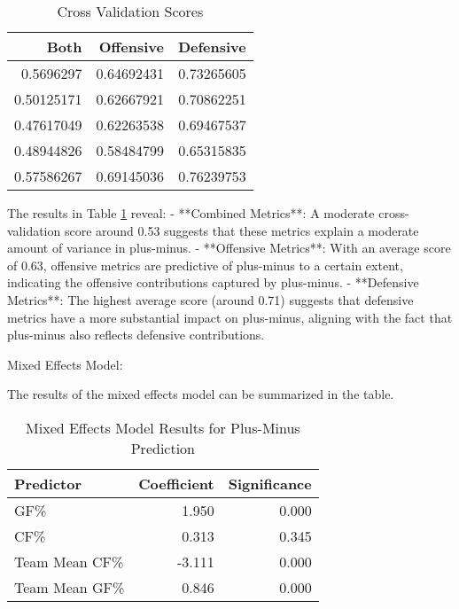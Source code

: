 \documentclass[12pt]{article}
\begin{document}
\begin{table}[tbp]
  \caption{Cross Validation Scores}
  \label{tab:rv}
\centering
\begin{tabular}{rrr}
  \toprule
Both & Offensive & Defensive \\ 
  \midrule
  0.5696297 & 0.64692431 & 0.73265605 \\ 
  0.50125171 & 0.62667921 & 0.70862251 \\ 
  0.47617049 & 0.62263538 & 0.69467537 \\ 
  0.48944826 & 0.58484799 & 0.65315835 \\ 
  0.57586267 & 0.69145036 & 0.76239753 \\ 
  \bottomrule
\end{tabular}
\end{table}

The results in Table \ref{tab:rv} reveal:
- **Combined Metrics**: A moderate cross-validation score around 0.53 suggests that these metrics explain a moderate amount of variance 
in plus-minus.
- **Offensive Metrics**: With an average score of 0.63, offensive metrics are predictive of plus-minus to a certain extent, indicating 
the offensive contributions captured by plus-minus.
- **Defensive Metrics**: The highest average score (around 0.71) suggests that defensive metrics have a more substantial impact on 
plus-minus, aligning with the fact that plus-minus also reflects defensive contributions.

Mixed Effects Model:

The results of the mixed effects model can be summarized in the table.

\begin{table}[tbp]
  \caption{Mixed Effects Model Results for Plus-Minus Prediction}
  \label{tab:mixed-effects}
  \centering
  \begin{tabular}{lrr}
    \toprule
    Predictor & Coefficient & Significance \\ 
    \midrule
    GF\% & 1.950 & 0.000 \\
    CF\% & 0.313 & 0.345 \\ 
    Team Mean CF\% & -3.111 & 0.000 \\ 
    Team Mean GF\% & 0.846 & 0.000 \\ 
    \bottomrule
\end{tabular}
\end{table}
\end{document}
